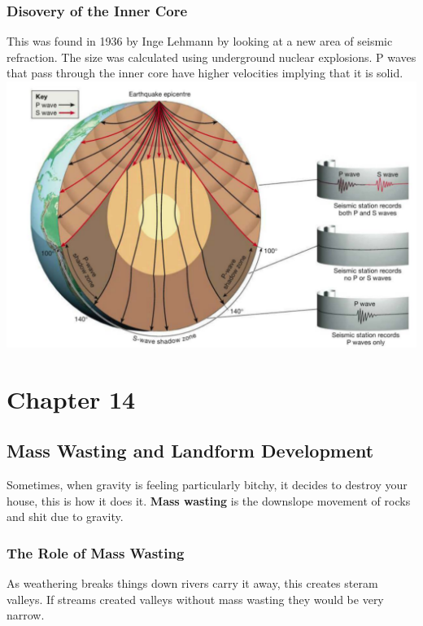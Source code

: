 \documentclass{article}
\begin{document}
\subsubsection{Disovery of the Inner Core} %
\label{ssub:disovery_of_the_inner_core}
This was found in 1936 by Inge Lehmann by looking at a new area of seismic refraction. The size was calculated using underground nuclear explosions. P waves that pass through the inner core have higher velocities implying that it is solid.
\includegraphics[width=7in]{waves}

\section{Chapter 14} %
\label{sec:chapter_14}
\subsection{Mass Wasting and Landform Development} %
\label{sub:mass_wasting_and_landform_development}
Sometimes, when gravity is feeling particularly bitchy, it decides to destroy your house, this is how it does it. \textbf{Mass wasting} is the downslope movement of rocks and shit due to gravity.

\subsubsection{The Role of Mass Wasting} %
\label{ssub:the_role_of_mass_wasting}
As weathering breaks things down rivers carry it away, this creates steram valleys. If streams created valleys without mass wasting they would be very narrow.
\end{document}
